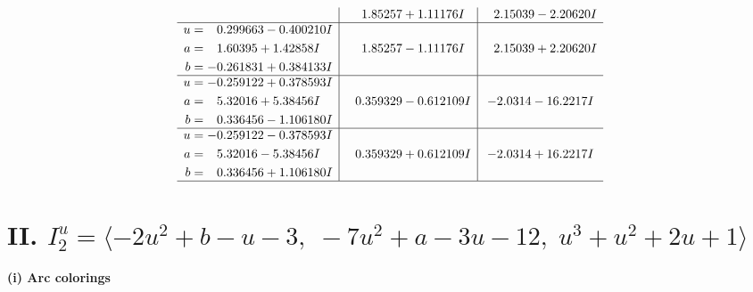 \documentclass[1p]{elsarticle_modified}
\theoremstyle{definition}
\begin{document}
$$\begin{array}{c|c|c}
 & \phantom{-}1.85257 + 1.11176 I & \phantom{-}2.15039 - 2.20620 I \\ \hline\begin{aligned}
u &= \phantom{-}0.299663 - 0.400210 I \\
a &= \phantom{-}1.60395 + 1.42858 I \\
b &= -0.261831 + 0.384133 I\end{aligned}
 & \phantom{-}1.85257 - 1.11176 I & \phantom{-}2.15039 + 2.20620 I \\ \hline\begin{aligned}
u &= -0.259122 + 0.378593 I \\
a &= \phantom{-}5.32016 + 5.38456 I \\
b &= \phantom{-}0.336456 - 1.106180 I\end{aligned}
 & \phantom{-}0.359329 - 0.612109 I & -2.0314 - 16.2217 I \\ \hline\begin{aligned}
u &= -0.259122 - 0.378593 I \\
a &= \phantom{-}5.32016 - 5.38456 I \\
b &= \phantom{-}0.336456 + 1.106180 I\end{aligned}
 & \phantom{-}0.359329 + 0.612109 I & -2.0314 + 16.2217 I\\
 \hline 
 \end{array}$$\newpage\newpage\renewcommand{\arraystretch}{1}
\centering \section*{II. $I^u_{2}= \langle -2 u^2+b- u-3,\;-7 u^2+a-3 u-12,\;u^3+u^2+2 u+1 \rangle$}
\flushleft \textbf{(i) Arc colorings}\\
\end{document}
